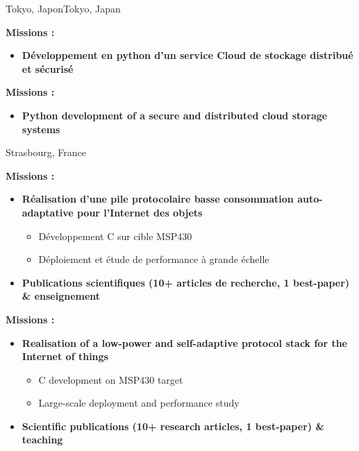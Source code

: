 {}{}{\ifnativelang Tokyo, Japon\else Tokyo, Japan\fi}{
\ifnativelang
	\textcolor{color1}{\textbf{Missions :}}
	\begin{itemize}
		\item \textbf{D\'eveloppement en python d'un service Cloud de stockage distribu\'e et s\'ecuris\'e}
	\end{itemize}
\else
	\textcolor{color1}{\textbf{Missions :}}
	\begin{itemize}
		\item \textbf{Python development of a secure and distributed cloud storage systems}
	\end{itemize}
\fi
}

\vspace{\ItemsSpacing}

{}{}{Strasbourg, France}{
\ifnativelang
	\textcolor{color1}{\textbf{Missions :}}
	\begin{itemize}
		\item \textbf{R\'ealisation d'une pile protocolaire basse consommation auto-adaptative pour l'Internet des objets}
		\begin{itemize}
			\item D\'eveloppement C sur cible MSP430
			\item D\'eploiement et étude de performance \`a grande \'echelle
		\end{itemize}
		\item \textbf{Publications scientifiques (10+ articles de recherche, 1 best-paper) \& enseignement}
	\end{itemize}
\else
\textcolor{color1}{\textbf{Missions :}}
	\begin{itemize}
		\item \textbf{Realisation of a low-power and self-adaptive protocol stack for the Internet of things}
		\begin{itemize}
			\item C development on MSP430 target
			\item Large-scale deployment and performance study
		\end{itemize}
		\item \textbf{Scientific publications (10+ research articles, 1 best-paper) \& teaching}
	\end{itemize}
\fi
}


